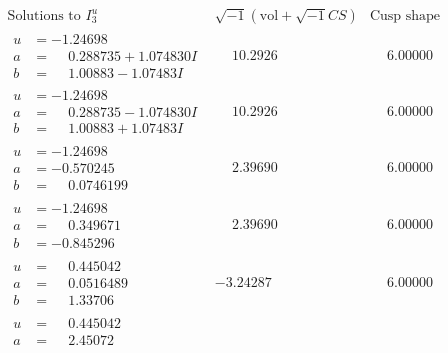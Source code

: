 \documentclass[1p]{elsarticle_modified}
\theoremstyle{definition}
\newcommand{\I}{\sqrt{-1}}
\begin{document}
$$\begin{array}{c|c|c}  
\text{Solutions to }I^u_{3}& \I (\text{vol} + \sqrt{-1}CS) & \text{Cusp shape}\\
 \hline 
\begin{aligned}
u &= -1.24698\phantom{ +0.000000I} \\
a &= \phantom{-}0.288735 + 1.074830 I \\
b &= \phantom{-}1.00883 - 1.07483 I\end{aligned}
 & \phantom{-}10.2926\phantom{ +0.000000I} & \phantom{-}6.00000\phantom{ +0.000000I} \\ \hline\begin{aligned}
u &= -1.24698\phantom{ +0.000000I} \\
a &= \phantom{-}0.288735 - 1.074830 I \\
b &= \phantom{-}1.00883 + 1.07483 I\end{aligned}
 & \phantom{-}10.2926\phantom{ +0.000000I} & \phantom{-}6.00000\phantom{ +0.000000I} \\ \hline\begin{aligned}
u &= -1.24698\phantom{ +0.000000I} \\
a &= -0.570245\phantom{ +0.000000I} \\
b &= \phantom{-}0.0746199\phantom{ +0.000000I}\end{aligned}
 & \phantom{-}2.39690\phantom{ +0.000000I} & \phantom{-}6.00000\phantom{ +0.000000I} \\ \hline\begin{aligned}
u &= -1.24698\phantom{ +0.000000I} \\
a &= \phantom{-}0.349671\phantom{ +0.000000I} \\
b &= -0.845296\phantom{ +0.000000I}\end{aligned}
 & \phantom{-}2.39690\phantom{ +0.000000I} & \phantom{-}6.00000\phantom{ +0.000000I} \\ \hline\begin{aligned}
u &= \phantom{-}0.445042\phantom{ +0.000000I} \\
a &= \phantom{-}0.0516489\phantom{ +0.000000I} \\
b &= \phantom{-}1.33706\phantom{ +0.000000I}\end{aligned}
 & -3.24287\phantom{ +0.000000I} & \phantom{-}6.00000\phantom{ +0.000000I} \\ \hline\begin{aligned}
u &= \phantom{-}0.445042\phantom{ +0.000000I} \\
a &= \phantom{-}2.45072\phantom{ +0.000000I} \\

\end{aligned}
\end{array}$$
\end{document}
